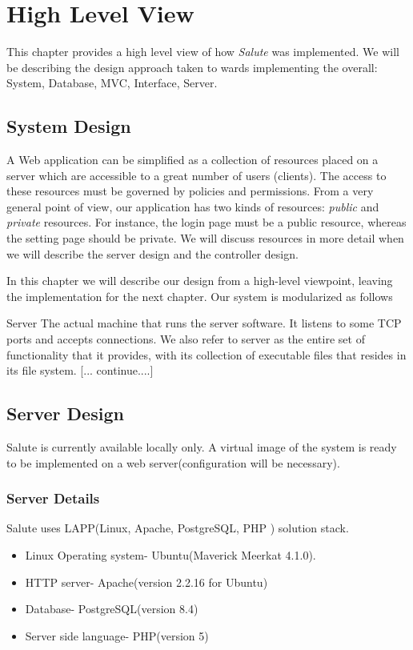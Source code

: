 \chapter{High Level View}
This chapter provides a high level view of how \emph{Salute} was implemented.  We will be describing the design approach taken to wards implementing the overall: System, Database, MVC, Interface, Server.

\section{System Design}
A Web application can be simplified as a collection of resources placed on a server which are accessible to a great number of users (clients). The access to these resources must be governed by policies and permissions. From a very general point of view, our application has two kinds of resources: \emph{public} and \emph{private} resources. For instance, the login page must be a public resource, whereas the setting page should be private. We will discuss resources in more detail when we will describe the server design and the controller design.


In this chapter we will describe our design from a high-level viewpoint, leaving the implementation for the next chapter. Our system is modularized as follows
\begin{description}
\item Server The actual machine that runs the server software. It listens to some TCP ports and accepts connections. We also refer to server as the entire set of functionality that it provides, with its collection of executable files that resides in its file system.
[... continue....]
\end{description}



\section{Server Design}
Salute is currently available locally only. A virtual image of the system is ready to be implemented on a web server(configuration will be necessary).

\subsection{Server Details}
Salute uses LAPP(Linux, Apache, PostgreSQL, PHP ) solution stack.
\begin{itemize}
\item Linux Operating system- Ubuntu(Maverick Meerkat 4.1.0). 
\item HTTP server- Apache(version 2.2.16 for Ubuntu)
\item Database- PostgreSQL(version 8.4)
\item Server side language- PHP(version 5)
\end{itemize}

